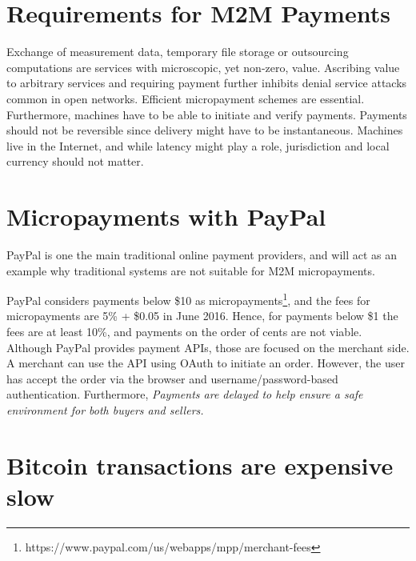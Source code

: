 \section{Requirements for M2M Payments}

Exchange of measurement data, temporary file storage or outsourcing computations are services with microscopic, yet non-zero, value. Ascribing value to arbitrary services and requiring payment further inhibits denial service attacks common in open networks. Efficient micropayment schemes are essential. Furthermore, machines have to be able to initiate and verify payments. Payments should not be reversible since delivery might have to be instantaneous. Machines live in the Internet, and while latency might play a role, jurisdiction and local currency should not matter. 


\section{Micropayments with PayPal}

PayPal is one the main traditional online payment providers, and will act as an example why traditional systems are not suitable for M2M micropayments.

PayPal considers payments below \$10 as micropayments\footnote{https://www.paypal.com/us/webapps/mpp/merchant-fees}, and the fees for micropayments are 5\% + \$0.05 in June 2016. Hence, for payments below \$1 the fees are at least 10\%, and payments on the order of cents are not viable. Although PayPal provides payment APIs, those are focused on the merchant side. A merchant can use the API using OAuth to initiate an order. However, the user has accept the order via the browser and username/password-based authentication. Furthermore, \emph{Payments are delayed to help ensure a safe environment for both buyers and sellers.}

\section{Bitcoin transactions are expensive slow}


